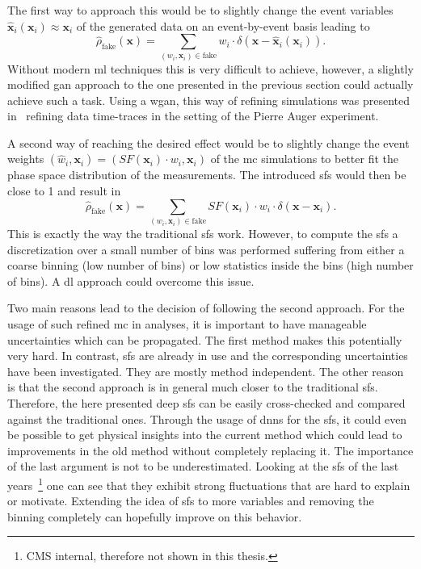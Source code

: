 The first way to approach this would be to slightly change the event variables \(\hat{\bm x}_i(\bm x_i) \approx \bm x_i\) of the generated data on an event-by-event basis leading to
\begin{equation}
    \hat\rho_\text{fake}(\bm x) = \sum_{(w_i, \bm x_i) \in \text{fake}} w_i \cdot \delta(\bm x - \hat{\bm x}_i (\bm x_i)).
\end{equation}
Without modern \gls{ml} techniques this is very difficult to achieve, however, a slightly modified \gls{gan} approach to the one presented in the previous section could actually achieve such a task. Using a \gls{wgan}, this way of refining simulations was presented in~\cite{wgan-auger} refining data time-traces in the setting of the Pierre Auger experiment.

A second way of reaching the desired effect would be to slightly change the event weights \( (\hat w_i, \bm x_i) = (SF(\bm x_i) \cdot w_i, \bm x_i)\) of the \gls{mc} simulations to better fit the phase space distribution of the measurements. The introduced \glspl{sf} would then be close to 1 and result in
\begin{equation}
    \hat\rho_\text{fake}(\bm x) = \sum_{(w_i, \bm x_i) \in \text{fake}} SF(\bm x_i) \cdot w_i \cdot \delta(\bm x - \bm x_i).
\end{equation}
This is exactly the way the traditional \glspl{sf} work. However, to compute the \glspl{sf} a discretization over a small number of bins was performed suffering from either a coarse binning (low number of bins) or low statistics inside the bins (high number of bins). A \gls{dl} approach could overcome this issue.

Two main reasons lead to the decision of following the second approach. For the usage of such refined \gls{mc} in analyses, it is important to have manageable uncertainties which can be propagated. The first method makes this potentially very hard. In contrast, \glspl{sf} are already in use and the corresponding uncertainties have been investigated. They are mostly method independent. The other reason is that the second approach is in general much closer to the traditional \glspl{sf}. Therefore, the here presented deep \glspl{sf} can be easily cross-checked and compared against the traditional ones. Through the usage of \glspl{dnn} for the \glspl{sf}, it could even be possible to get physical insights into the current method which could lead to improvements in the old method without completely replacing it. The importance of the last argument is not to be underestimated. Looking at the \glspl{sf} of the last years~\cite{sf-an}\footnote{CMS internal, therefore not shown in this thesis.} one can see that they exhibit strong fluctuations that are hard to explain or motivate. Extending the idea of \glspl{sf} to more variables and removing the binning completely can hopefully improve on this behavior.

